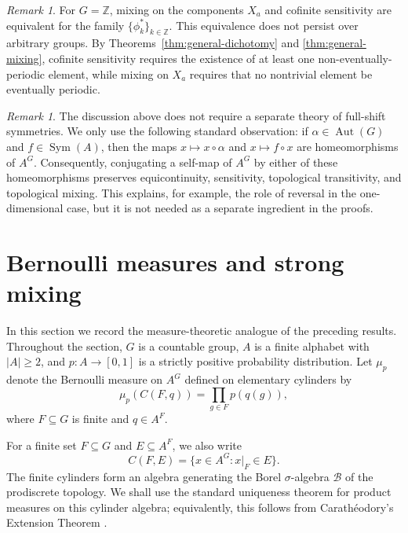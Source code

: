 \documentclass[12pt,a4paper]{article}
\theoremstyle{definition}
\theoremstyle{remark}
\newtheorem{remark}[theorem]{Remark}
\newcommand{\ZZ}{\mathbb{Z}}
\newcommand{\calB}{\mathcal{B}}
\begin{document}
\begin{remark}\label{rem:mixing-vs-cofinite}
For $G=\ZZ$, mixing on the components $X_a$ and cofinite sensitivity are equivalent for the family $\{\phi_k^*\}_{k\in\ZZ}$. This equivalence does not persist over arbitrary groups. By Theorems~\ref{thm:general-dichotomy} and \ref{thm:general-mixing}, cofinite sensitivity requires the existence of at least one non-eventually-periodic element, while mixing on $X_a$ requires that no nontrivial element be eventually periodic.
\end{remark}

\begin{remark}\label{rem:full-shift-symmetries}
The discussion above does not require a separate theory of full-shift symmetries. We only use the following standard observation: if $\alpha\in\operatorname{Aut}(G)$ and $f\in\operatorname{Sym}(A)$, then the maps $x\mapsto x\circ\alpha$ and $x\mapsto f\circ x$ are homeomorphisms of $A^G$. Consequently, conjugating a self-map of $A^G$ by either of these homeomorphisms preserves equicontinuity, sensitivity, topological transitivity, and topological mixing. This explains, for example, the role of reversal in the one-dimensional case, but it is not needed as a separate ingredient in the proofs.
\end{remark}


\section{Bernoulli measures and strong mixing}\label{sec:bernoulli}

In this section we record the measure-theoretic analogue of the preceding results. Throughout the section, $G$ is a countable group, $A$ is a finite alphabet with $|A|\geq 2$, and $p:A\to[0,1]$ is a strictly positive probability distribution. Let $\mu_p$ denote the Bernoulli measure on $A^G$ defined on elementary cylinders by
\[
\mu_p(C(F,q))=\prod_{g\in F}p(q(g)),
\]
where $F\subseteq G$ is finite and $q\in A^F$.

For a finite set $F\subseteq G$ and $E\subseteq A^F$, we also write
\[
C(F,E)=\{x\in A^G:x|_F\in E\}.
\]
The finite cylinders form an algebra generating the Borel $\sigma$-algebra $\calB$ of the prodiscrete topology. We shall use the standard uniqueness theorem for product measures on this cylinder algebra; equivalently, this follows from Carath\'{e}odory's Extension Theorem \cite{FollandRA}.
\end{document}
